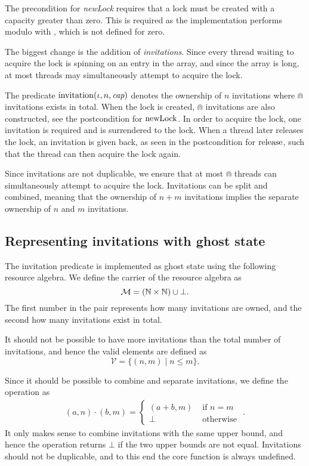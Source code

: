 The precondition for \textit{newLock} requires that a lock must be created with
a capacity greater than zero. This is required as the implementation performs
modulo with \Cap, which is not defined for zero.

The biggest change is the addition of \textit{invitations}. Since every thread
waiting to acquire the lock is spinning on an entry in the array, and since the
array is \Cap long, at most \Cap{} threads may simultaneously attempt to acquire
the lock.

The predicate $\operatorname{invitation}(\iota, n, \textit{cap})$ denotes the ownership of $n$
invitations where $\Cap$ invitations exists in total. When the lock is created,
$\Cap$ invitations are also constructed, see
the postcondition for $\operatorname{newLock}$. In order to acquire the lock, one invitation
is required and is surrendered to the lock. When a thread later releases the lock, an
invitation is given back, as seen in the postcondition for $\operatorname{release}$, such that
the thread can then acquire the lock again.

Since invitations are not duplicable, we ensure that at most $\Cap$ threads
can simultaneously attempt to acquire the lock. Invitations can be split
and combined, meaning that the ownership of $n + m$ invitations implies the
separate ownership of $n$ and $m$ invitations.

\subsection{Representing invitations with ghost state}

The invitation predicate is implemented as ghost state using the following
resource algebra. We define the carrier of the resource algebra as
\[
  \mathcal{M} = (\mathbb{N} \times \mathbb{N}) \cup \bot.
\]
The first number in the pair represents how many invitations are owned, and the
second how many invitations exist in total.

It should not be possible to have more invitations than the total number of
invitations, and hence the valid elements are defined as
\[
\mathcal{V} = \{ (n,m) \mid n \leq m \}.
\]

Since it should be possible to combine and separate invitations, we define the
operation as
\begin{align*}
  (a, n) \cdot (b, m) =
    \begin{cases}
      (a + b, m) & \text{ if } n = m \\
      \bot & \text{ otherwise }
    \end{cases}.
\end{align*}
It only makes sense to combine invitations with the same upper bound, and hence
the operation returns $\bot$ if the two upper bounds are not equal. Invitations
should not be duplicable, and to this end the core function is
always undefined.


